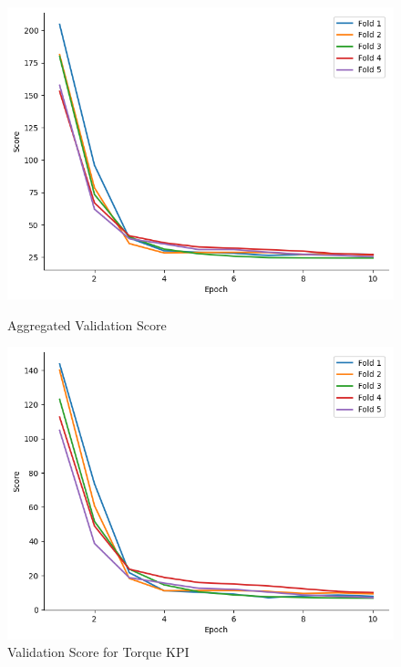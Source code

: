 \documentclass{report} %
\begin{document}
\begin{figure}[H]
    \centering
    \begin{minipage}[b]{0.325\textwidth}
        \includegraphics[width=\textwidth]{./ReportImages/val_score.png}
        \caption{\centering Aggregated Validation Score}
        \label{fig:Aggregated Validation Score}
    \end{minipage}
    \begin{minipage}[b]{0.325\textwidth}
        \includegraphics[width=\textwidth]{./ReportImages/val_score_y1.png}
        \caption{\centering Validation Score for Torque \ac{KPI}}
        \label{fig:Validation Score for Torque Curve}
    \end{minipage}

\end{figure}
\end{document}
